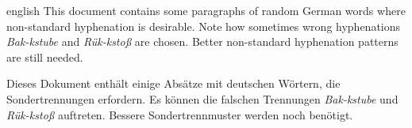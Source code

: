 \documentclass{article}
\begin{document}
\begin{otherlanguage*}{english}
  This document contains some paragraphs of random German words where
  non-standard hyphenation is desirable.  Note how sometimes wrong
  hyphenations \emph{Bak-kstube} and \emph{Rük-kstoß} are chosen.
  Better non-standard hyphenation patterns are still needed.
\end{otherlanguage*}

\bigskip

Dieses Dokument enthält einige Absätze mit deutschen Wörtern, die
Sondertrennungen erfordern.  Es können die falschen Trennungen
\emph{Bak-kstube} und \emph{Rük-kstoß} auftreten.  Bessere
Sondertrennmuster werden noch benötigt.

\bigskip

\end{document}
